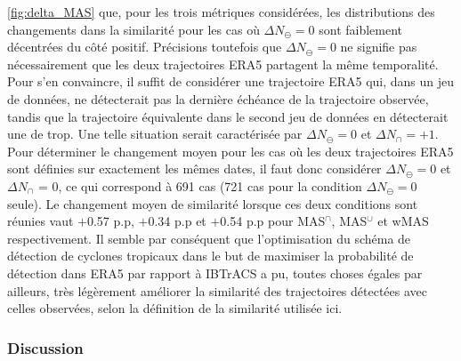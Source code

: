 \documentclass[../main.tex]{subfiles}
\begin{document}
\cref{fig:delta_MAS} que, pour les trois métriques considérées, les distributions des changements dans la similarité pour les cas où $\Delta N_\ominus = 0$ sont
faiblement décentrées du côté positif. Précisions toutefois que $\Delta N_\ominus =0$ ne signifie pas nécessairement que les deux trajectoires ERA5 partagent la
même temporalité. Pour s'en convaincre, il suffit de considérer une trajectoire ERA5 qui, dans un jeu de données, ne détecterait pas la dernière échéance de la
trajectoire observée, tandis que la trajectoire équivalente dans le second jeu de données en détecterait une de trop. Une telle situation serait caractérisée
par $\Delta N_\ominus = 0$ et $\Delta N_\cap = +1$. Pour déterminer le changement moyen pour les cas où les deux trajectoires ERA5 sont définies sur exactement
les mêmes dates, il faut donc considérer $\Delta N_\ominus = 0$ et $\Delta N_\cap$ = 0, ce qui correspond à \num{691} cas (\num{721} cas pour la condition
$\Delta N_\ominus = 0$ seule). Le changement moyen de similarité lorsque ces deux conditions sont réunies vaut $+$\num{0.57} p.p, $+$\num{0.34} p.p et
$+$\num{0.54} p.p pour MAS$^\cap$, MAS$^\cup$ et wMAS respectivement. Il semble par conséquent que l'optimisation du schéma de détection de cyclones tropicaux
dans le but de maximiser la probabilité de détection dans ERA5 par rapport à IBTrACS a pu, toutes choses égales par ailleurs, très légèrement améliorer la
similarité des trajectoires détectées avec celles observées, selon la définition de la similarité utilisée ici.

\subsubsection*{Discussion}
\end{document}
